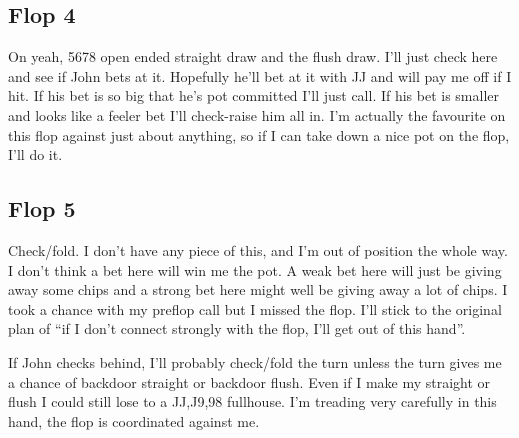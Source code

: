 \subsection*{Flop 4}

\begin{cards}
\crdsevh\crdfivec\crdtwoc%
\end{cards}

On yeah, 5678 open ended straight draw and the flush draw. I'll just
check here and see if John bets at it. Hopefully he'll bet at it with
JJ and will pay me off if I hit. If his bet is so big that he's pot
committed I'll just call. If his bet is smaller and looks like
a feeler bet I'll check-raise him all in. I'm actually the
favourite on this flop against just about anything, so if I
can take down a nice pot on the flop, I'll do it.

\subsection*{Flop 5}

\begin{cards}
\crdJh\crdnineh\crdninec%
\end{cards}

Check/fold. I don't have any piece of this, and I'm out of
position the whole way. I don't think a bet here will win me
the pot. A weak bet here will just be giving away some chips
and a strong bet here might well be giving away a lot of chips.
I took a chance with my preflop call but I missed the flop.
I'll stick to the original plan of ``if I don't connect strongly with
the flop, I'll get out of this hand''.

If John checks behind, I'll probably check/fold the
turn unless the turn gives me a chance of backdoor straight
or backdoor flush. Even if I make my straight or flush I could
still lose to a JJ,J9,98 fullhouse. I'm treading very carefully in
this hand, the flop is coordinated against me.


